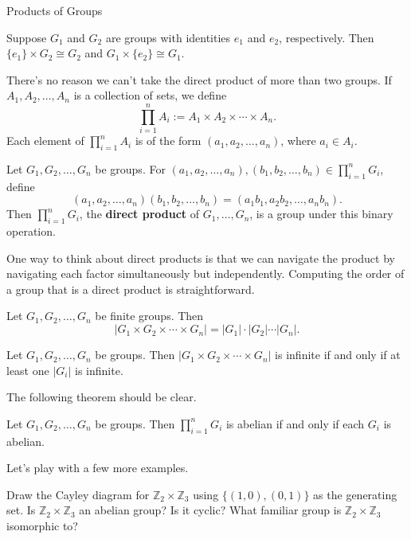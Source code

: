 \begin{section}{Products of Groups}
\begin{theorem}
Suppose $G_1$ and $G_2$ are groups with identities $e_1$ and $e_2$, respectively.  Then $\{e_1\}\times G_2\cong G_2$ and $G_1\times \{e_2\}\cong G_1$.
\end{theorem}

There's no reason we can't take the direct product of more than two groups.  If $A_1, A_2, \ldots, A_n$ is a collection of sets, we define
\[
\prod_{i=1}^nA_i:=A_1\times A_2\times \cdots \times A_n.
\]
Each element of $\prod_{i=1}^nA_i$ is of the form $(a_1,a_2,\ldots, a_n)$, where $a_i\in A_i$.

\begin{theorem}
Let $G_1, G_2,\ldots, G_n$ be groups.  For $(a_1,a_2, \ldots, a_n), (b_1,b_2,\ldots, b_n)\in \prod_{i=1}^nG_i$, define
\[
(a_1,a_2, \ldots, a_n)(b_1,b_2,\ldots, b_n)=(a_1b_1,a_2b_2,\ldots, a_nb_n).
\]
Then $\prod_{i=1}^nG_i$, the \textbf{direct product} of $G_1,\ldots, G_n$, is a group under this binary operation.
\end{theorem}

One way to think about direct products is that we can navigate the product by navigating each factor simultaneously but independently. Computing the order of a group that is a direct product is straightforward.

\begin{theorem}
Let $G_1, G_2,\ldots, G_n$ be finite groups.  Then
\[
|G_1\times G_2\times \cdots \times G_n|=|G_1|\cdot|G_2|\cdots |G_n|.
\]
\end{theorem}

\begin{theorem}
Let $G_1, G_2,\ldots, G_n$ be groups.  Then $|G_1\times G_2\times \cdots \times G_n|$ is infinite if and only if at least one $|G_i|$ is infinite.
\end{theorem}

The following theorem should be clear.

\begin{theorem}\label{thm:product_abelian_groups}
Let $G_1, G_2,\ldots, G_n$ be groups.  Then $\prod_{i=1}^nG_i$ is abelian if and only if each $G_i$ is abelian.
\end{theorem}

Let's play with a few more examples.

\begin{problem}
Draw the Cayley diagram for $\mathbb{Z}_2\times \mathbb{Z}_3$ using $\{(1,0),(0,1)\}$ as the generating set. Is $\mathbb{Z}_2\times \mathbb{Z}_3$ an abelian group?  Is it cyclic? What familiar group is $\mathbb{Z}_2\times \mathbb{Z}_3$ isomorphic to?
\end{problem}


\end{section}
